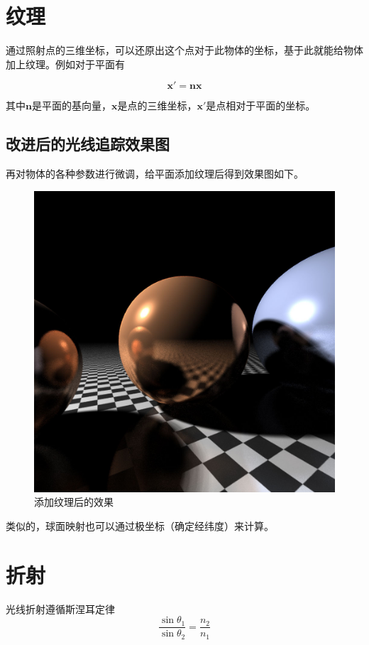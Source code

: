 \documentclass[10pt,twocolumn]{article}
\begin{document}
\section{\hei 纹理}
通过照射点的三维坐标，可以还原出这个点对于此物体的坐标，基于此就能给物体加上纹理。例如对于平面有

\begin{equation}
\mathbf{x'}=\mathbf{nx}
\end{equation}

其中$\mathbf{n}$是平面的基向量，$\mathbf{x}$是点的三维坐标，$\mathbf{x'}$是点相对于平面的坐标。

\subsection{\hei 改进后的光线追踪效果图}
再对物体的各种参数进行微调，给平面添加纹理后得到效果图如下。
\begin{figure}[ht]
\centering
\includegraphics[scale=.2]{fig9.jpg}
\caption{添加纹理后的效果}
\end{figure}

类似的，球面映射也可以通过极坐标（确定经纬度）来计算。

\section{\hei 折射}
光线折射遵循斯涅耳定律
\begin{equation}
\frac{\sin{\theta_1}}{\sin{\theta_2}}=\frac{n_2}{n_1}
\end{equation}
\end{document}
